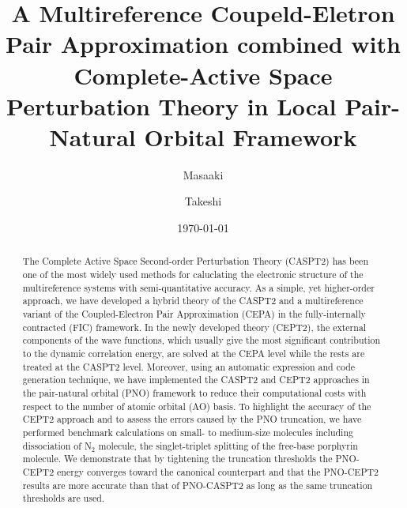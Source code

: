 \documentclass[aip,jcp,amsmath,twocolumn,floatfix,reprint,fleqn]{revtex4-1}
\begin{document}
\title{\color{blue}
  A Multireference Coupeld-Eletron Pair Approximation combined with Complete-Active Space Perturbation Theory in Local Pair-Natural Orbital Framework}
\date{\today}
\author{Masaaki }

\author{Takeshi }

\begin{abstract}  
  The Complete Active Space Second-order Perturbation Theory (CASPT2) has been one of the most widely used methods for caluclating the electronic structure of the multireference systems with semi-quantitative accuracy.
  As a simple, yet higher-order approach, we have developed a hybrid theory of the CASPT2 and a multireference variant of the Coupled-Electron Pair Approximation (CEPA) in the fully-internally contracted (FIC) framework.
  In the newly developed theory (CEPT2), the external components of the wave functions, which usually give the most significant contribution to the dynamic correlation energy, are solved at the CEPA level while the rests are treated at the CASPT2 level.
  Moreover, using an automatic expression and code generation technique, we have implemented the CASPT2 and CEPT2 approaches in the pair-natural orbital (PNO) framework to reduce their computational costs with respect to the number of atomic orbital (AO) basis.
  To highlight the accuracy of the CEPT2 approach and to assess the errors caused by the PNO truncation, we have performed benchmark calculations on small- to medium-size molecules including dissociation of N${}_2$ molecule, the singlet-triplet splitting of the free-base porphyrin molecule.
  We demonstrate that by tightening the truncation thresholds the PNO-CEPT2 energy converges toward the canonical counterpart and that the PNO-CEPT2 results are more accurate than that of PNO-CASPT2 as long as the same truncation thresholds are used.
  
\end{abstract}

\maketitle
\end{document}

